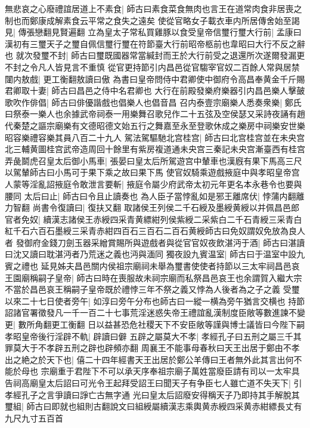 無悲哀之心廢禮誼居道上不素食|{
	師古曰素食菜食無肉也言王在道常肉食非居喪之制也而鄭康成解素食云平常之食失之遠矣}
使從官略女子載衣車内所居傳舍始至謁見|{
	傳張戀翻見賢遍翻}
立為皇太子常私買雞豚以食受皇帝信璽行璽大行前|{
	孟康曰漢初有三璽天子之璽自佩信璽行璽在符節臺大行前昭帝柩前也韋昭曰大行不反之辭也}
就次發璽不封|{
	師古曰璽既國器常當緘封而王於大行前受之退還所次遂爾發漏更不封之令凡人皆見言不重慎}
從官更持節引内昌邑從官騶宰官奴二百餘人常與居禁闥内敖戲|{
	更工衡翻敖讀曰傲}
為書曰皇帝問侍中君卿使中御府令高昌奉黄金千斤賜君卿取十妻|{
	師古曰昌邑之侍中名君卿也}
大行在前殿發樂府樂器引内昌邑樂人擊皷歌吹作俳倡|{
	師古曰俳優諧戲也倡樂人也倡音昌}
召内泰壹宗廟樂人悉奏衆樂|{
	鄭氏曰祭泰一樂人也余據武帝祠泰一用樂舞召歌兒作二十五弦及空侯瑟又采詩夜誦有趙代秦楚之謳宗廟樂有文德昭德文始五行之舞嘉至永至登歌休成之樂房中祠樂安世樂昭容樂禮容樂其員八百二十九人}
駕法駕驅馳北宫桂宫|{
	師古曰北宫桂宫並在未央宫北三輔黄圖桂宫武帝造周回十餘里有紫房複道通未央宫三秦記未央宫漸臺西有桂宫}
弄彘鬬虎召皇太后御小馬車|{
	張晏曰皇太后所駕遊宫中輦車也漢廐有果下馬高三尺以駕輦師古曰小馬可于果下乘之故曰果下馬}
使官奴騎乘遊戲掖庭中與孝昭皇帝宫人蒙等淫亂詔掖庭令敢泄言要斬|{
	掖庭令屬少府武帝太初元年更名本永巷令也要與腰同}
太后曰止|{
	師古曰令且止讀奏也}
為人臣子當悖亂如是邪王離席伏|{
	悖蒲内翻離力智翻}
尚書令復讀曰|{
	復扶又翻}
取諸侯王列侯二千石綬及墨綬黄綬以并佩昌邑郎官者免奴|{
	續漢志諸侯王赤綬四采青黄縹紺列侯紫綬二采紫白二千石青綬三采青白紅千石六百石墨綬三采青赤紺四百石三百石二百石黄綬師古曰免奴謂奴免放為良人者}
發御府金錢刀劍玉器采繒賞賜所與遊戲者與從官官奴夜飲湛沔于酒|{
	師古曰湛讀曰沈又讀曰耽湛沔者乃荒迷之義也沔與湎同}
獨夜設九賓温室|{
	師古曰于温室中設九賓之禮也}
延見姊夫昌邑關内侯祖宗廟祠未舉為璽書使使者持節以三太牢祠昌邑哀王園廟稱嗣子皇帝|{
	師古曰時在喪服故未祠宗廟而私祭昌邑哀王也余謂賀入繼大宗不當於昌邑哀王稱嗣子皇帝既於禮悖三年不祭之義又悖為人後者為之子之義}
受璽以來二十七日使者旁午|{
	如淳曰旁午分布也師古曰一縱一横為旁午猶言交横也}
持節詔諸官署徵發凡一千一百二十七事荒淫迷惑失帝王禮誼亂漢制度臣敞等數進諫不變更|{
	數所角翻更工衡翻}
日以益甚恐危社稷天下不安臣敞等謹與博士議皆曰今陛下嗣孝昭皇帝後行淫辟不軌|{
	辟讀曰僻}
五辟之屬莫大不孝|{
	孝經孔子曰五刑之屬三千其罪莫大于不孝辟五刑之辟也辟頻亦翻}
周襄王不能事母春秋曰天王出居于鄭由不孝出之絶之於天下也|{
	僖二十四年經書天王出居於鄭公羊傳曰王者無外此其言出何不能於母也}
宗廟重于君陛下不可以承天序奉祖宗廟子萬姓當廢臣請有司以一太牢具告祠高廟皇太后詔曰可光令王起拜受詔王曰聞天子有争臣七人雖亡道不失天下|{
	引孝經孔子之言爭讀曰諍亡古無字通}
光曰皇太后詔廢安得稱天子乃即持其手解脫其璽組|{
	師古曰即就也組則古翻說文曰組綬屬續漢志乘輿黄赤綬四采黄赤紺縹長丈有九尺九寸五百首}
